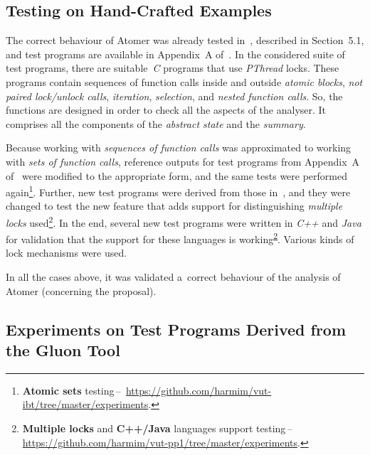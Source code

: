 \subsection{Testing on Hand-Crafted Examples}
\label{sec:expPurpos}

The correct behaviour of Atomer was already tested in~\cite{harmimBP},
described in Section~5.1, and test programs are available in Appendix~A
of~\cite{harmimBP}. In the considered suite of test programs, there are
suitable~\emph{C} programs that use \emph{PThread} locks. These programs
contain sequences of function calls inside and outside \emph{atomic blocks},
\emph{not paired lock/unlock calls}, \emph{iteration}, \emph{selection}, and
\emph{nested function calls}. So, the functions are designed in order to check
all the aspects of the analyser. It comprises all the components of the
\emph{abstract state} and the \emph{summary}.

Because working with \emph{sequences of function calls} was approximated to
working with \emph{sets of function calls}, reference outputs for test programs
from Appendix~A of~\cite{harmimBP} were modified to the appropriate form, and
the same tests were performed again\footnote{\textbf{Atomic sets} testing\,--\,%
\url{https://github.com/harmim/vut-ibt/tree/master/experiments}.}. Further,
new test programs were derived from those \linebreak in~\cite{harmimBP}, and
they were changed to test the new feature that adds support for distinguishing
\emph{multiple locks} used\footnote{\label{fn:test2}\textbf{Multiple locks} and
\textbf{C++/Java} languages support testing\,--\,%
\url{https://github.com/harmim/vut-pp1/tree/master/experiments}.}. In the end,
several new test programs were written in \emph{C++} and \emph{Java}
for validation that the support for these languages is
working\textsuperscript{\ref{fn:test2}}. Various kinds of lock mechanisms were
used.

In all the cases above, it was validated a~correct behaviour of the analysis
of Atomer (concerning the proposal).

\subsection{Experiments on Test Programs Derived from the Gluon Tool}
\label{sec:expGluon}

